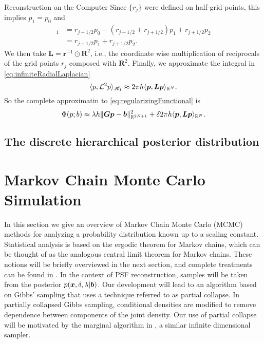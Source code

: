 \begin{chapter}{Reconstruction on the Computer}
Since $\{r_j\}$ were defined on half-grid points, this implies $p_1 = p_{0}$ and
\begin{align}
  [\vect R\vect p]_1 &= r_{j-1/2}p_0 - (r_{j-1/2}+r_{j+1/2})p_1 + r_{j+1/2}p_{2} \nonumber\\
  &= r_{j+1/2}p_1 + r_{j+1/2}p_{2}.
\end{align}
We then take $\bm L = \bm r^{-1} \odot \bm R^2$, i.e., the coordinate wise multiplication of reciprocals of the grid points $r_j$ composed with $\bm R^2$.
Finally, we approximate the integral in \eqref{eq:infiniteRadialLaplacian} 
\begin{equation}\label{eq:psfDiscInvProblem}
  \langle p, \mathcal L^2 p\rangle_{\mathscr H_1} \approx 2\pi h \langle \mbox{\boldmath$p$}, \mbox{\boldmath$L$} \mbox{\boldmath$p$}\rangle_{\mathbb R^N}.
\end{equation}
So the complete approximatin to \eqref{eq:regularizingFunctional} is
\begin{equation} \label{eq:discreteRegularizingFunctional}
  \Phi(p; b) \approx \lambda h \|\mbox{\boldmath$G$}\mbox{\boldmath$p$} - \mbox{\boldmath$b$}\|_{\mathbb R^{2N+1}}^2 + \delta 2\pi h\langle \mbox{\boldmath$p$}, \mbox{\boldmath$L$} \mbox{\boldmath$p$}\rangle_{\mathbb R^N}.
\end{equation}

  \subsection{The discrete hierarchical posterior distribution}

\section{Markov Chain Monte Carlo Simulation} \label{sec:pcgibbs}
In this section we give an overview of Markov Chain Monte Carlo (MCMC) methods for analyzing a probability distribution known up to a scaling constant.
Statistical analysis is based on the ergodic theorem for Markov chains, which can be thought of as the analogous central limit theorem for Markov chains. 
These notions will be briefly overviewed in the next section, and complete treatments can be found in \citep{robert2013monte,liu2008monte}.
In the context of PSF reconstruction, samples will be taken from the posterior $p(\mbox{\boldmath$x$},\delta,\lambda|\mbox{\boldmath$b$})$.
Our development will lead to an algorithm based on Gibbs' sampling that uses a technique referred to as partial collapse.  
In partially collapsed Gibbs sampling, conditional densities are modified to remove dependence between components of the joint density.
Our use of partial collapse will be motivated by the marginal algorithm in \citep{agapiou2014analysis}, a similar infinite dimensional sampler.


\end{chapter}
